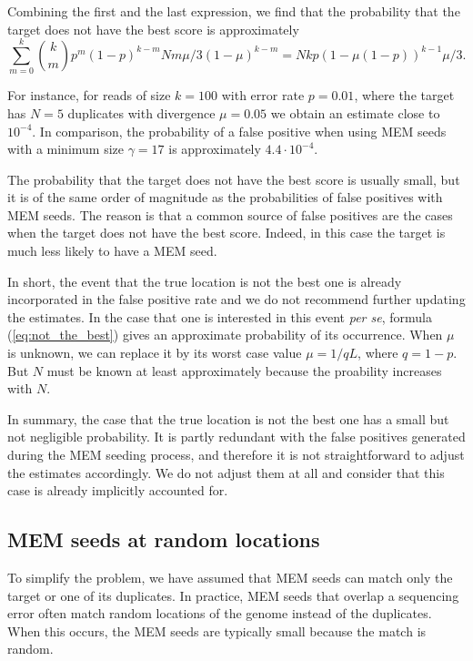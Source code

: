 \documentclass{article}
\begin{document}
Combining the first and the last expression, we find that the probability
that the target does not have the best score is approximately
\begin{equation}
\label{eq:not_the_best}
\sum_{m=0}^k {k \choose m}p^m(1-p)^{k-m} Nm\mu/3(1-\mu)^{k-m} = 
Nk p \left(1-\mu(1-p)\right)^{k-1}\mu/3.
\end{equation}

For instance, for reads of size $k=100$ with error rate $p=0.01$, where
the target has $N=5$ duplicates with divergence $\mu=0.05$ we obtain an
estimate close to $10^{-4}$. In comparison, the probability of a false
positive when using MEM seeds with a minimum size $\gamma=17$ is
approximately $4.4\cdot10^{-4}$.

The probability that the target does not have the best score is usually
small, but it is of the same order of magnitude as the probabilities of
false positives with MEM seeds. The reason is that a common source of
false positives are the cases when the target does not have the best
score. Indeed, in this case the target is much less likely to have a MEM
seed.

In short, the event that the true location is not the best one is already
incorporated in the false positive rate and we do not recommend further
updating the estimates. In the case that one is interested in this event
\textit{per se}, formula (\ref{eq:not_the_best}) gives an approximate
probability of its occurrence. When $\mu$ is unknown, we can replace it by
its worst case value $\mu = 1/qL$, where $q=1-p$. But $N$ must be known at
least approximately because the proability increases with $N$.

In summary, the case that the true location is not the best one has a
small but not negligible probability. It is partly redundant with the
false positives generated during the MEM seeding process, and therefore it
is not straightforward to adjust the estimates accordingly. We do not
adjust them at all and consider that this case is already implicitly
accounted for.

\subsection{MEM seeds at random locations}
\label{sec:short_MEMs}

To simplify the problem, we have assumed that MEM seeds can match only the
target or one of its duplicates. In practice, MEM seeds that overlap a
sequencing error often match random locations of the genome instead of the
duplicates. When this occurs, the MEM seeds are typically small because 
the match is random.
\end{document}
